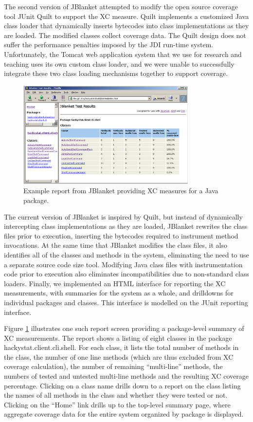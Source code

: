 \documentclass[10pt,twocolumn]{article}
\begin{document}
The second version of JBlanket attempted to modify the open source coverage
tool JUnit Quilt to support the XC measure. Quilt implements a customized Java
class loader that dynamically inserts bytecodes into class implementations
as they are loaded. The modified classes collect coverage data.  The Quilt
design does not suffer the performance penalties imposed by the JDI
run-time system.  Unfortunately, the Tomcat web application system that we
use for research and teaching uses its own custom class loader, 
and we were unable to successfully integrate these two class loading
mechanisms together to support coverage. 

\begin{figure}[ht]
  \centering
  \includegraphics[width=0.8\textwidth]{fig.hackystat2.jblanket.package.eps}
  \caption{Example report from JBlanket providing XC measures for a Java package.}
  \label{fig:JBlanket}
\end{figure}

The current version of JBlanket is inspired by Quilt, but instead of
dynamically intercepting class implementations as they are loaded, JBlanket
rewrites the class files prior to execution, inserting the bytecodes
required to instrument method invocations.  At the same time that JBlanket
modifies the class files, it also identifies all of the classes and methods
in the system, eliminating the need to use a separate source code size
tool.  Modifying Java class files with instrumentation code prior to
execution also eliminates incompatibilities due to non-standard class
loaders. Finally, we implemented an HTML interface for reporting the XC
measurements, with summaries for the system as a whole, and drilldowns for
individual packages and classes. This interface is modelled on the JUnit
reporting interface.  

Figure \ref{fig:JBlanket} illustrates one such report screen providing a
package-level summary of XC measurements. The report shows a listing of
eight classes in the package hackystat.client.cli.shell. For each class, it
lists the total number of methods in the class, the number of one line
methods (which are thus excluded from XC coverage calculation), the number
of remaining ``multi-line'' methods, the numbers of tested and untested
multi-line methods and the resulting XC coverage percentage. Clicking on a
class name drills down to a report on the class listing the names of all
methods in the class and whether they were tested or not. Clicking on the
``Home'' link drills up to the top-level summary page, where aggregate
coverage data for the entire system organized by package is displayed.
\end{document}
